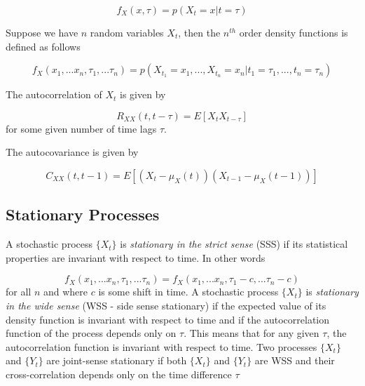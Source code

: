 \documentclass[]{article}
\begin{document}
\begin{equation} f_{X}(x, \tau) = p(X_{t} = x|t=\tau) \end{equation}

Suppose we have $n$ random variables $X_{t}$, then the $n^{th}$ order density functions is defined as follows

\begin{equation} f_{X}(x_{1},...x_{n}, \tau_{1},...\tau_{n}) = p(X_{t_{1}} = x_{1},..., X_{t_{n}} = x_{n}|t_{1}=\tau_{1},..., t_{n}=\tau_{n}) \end{equation}

The autocorrelation of $X_{t}$ is given by

\begin{equation} R_{XX}(t, t-\tau) = E[X_{t}X_{t-\tau}] \end{equation}
for some given number of time lags $\tau$.

The autocovariance is given by

\begin{equation} C_{XX}(t, t-1) = E[(X_{t}-\mu_{X}(t))(X_{t-1}-\mu_{X}(t-1))] \end{equation}

\subsection{Stationary Processes}
A stochastic process $\{ X_{t} \}$ is \textit{stationary in the strict sense} (SSS) if its statistical properties are invariant with respect to time. In other words

\begin{equation} f_{X}(x_{1},...x_{n}, \tau_{1},...\tau_{n}) = f_{X}(x_{1},...x_{n}, \tau_{1}-c,...\tau_{n}-c) \end{equation}
for all $n$ and where $c$ is some shift in time.
\newline
\newline
\noindent
A stochastic process $\{ X_{t} \}$ is \textit{stationary in the wide sense} (WSS - side sense stationary) if the expected value of its density function is invariant with respect to time and if the autocorrelation function of the process depends only on $\tau$. This means that for any given $\tau$, the autocorrelation function is invariant with respect to time.
\newline
\newline
\noindent
Two processes $\{ X_{t} \}$ and $\{ Y_{t} \}$ are joint-sense stationary if both $\{ X_{t} \}$ and $\{ Y_{t} \}$ are WSS and their cross-correlation depends only on the time difference $\tau$
\end{document}
